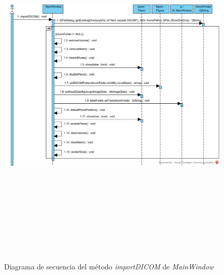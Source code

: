 \begin{figure}[H]
	\centering
	\includegraphics[angle=90,height=18cm]{imagenes/diagramas/secuencia/MainWindow_ImportDICOM}
	\caption{Diagrama de secuencia del método \textit{importDICOM} de \textit{MainWindow}}
	\label{fig:diagrama_secuencia_mainwindow_importdicom}
\end{figure}

